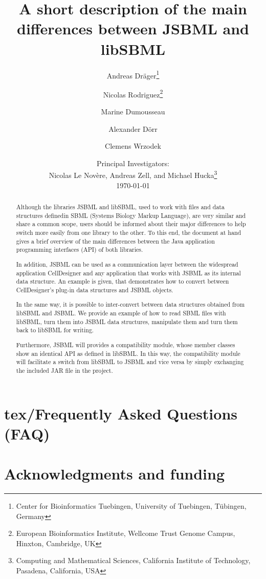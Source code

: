 \documentclass[
  BCOR12mm,
  letterpaper,
  11pt,
  headsepline,
  numbers=noenddot,
  caption=oneline,
  headinclude,
  appendixprefix,
  index=totoc,
  bibliography=totoc,
  twoside,
  titlepage
]{scrartcl}
\title{A short description of the main differences between JSBML and libSBML}
\author{Andreas Dr\"ager\thanks{Center for Bioinformatics Tuebingen, University
of Tuebingen, T\"ubingen, Germany}\and%
Nicolas Rodriguez\thanks{European Bioinformatics Institute, Wellcome Trust
Genome Campus, Hinxton, Cambridge, UK}\and%
Marine Dumousseau\footnotemark[2]\and%
Alexander D\"orr\footnotemark[1]\and%
Clemens Wrzodek\footnotemark[1]}
\date{Principal Investigators:\\
Nicolas Le Nov{\`e}re\footnotemark[2], Andreas Zell\footnotemark[1], and Michael
Hucka\thanks{Computing and Mathematical Sciences, California Institute of
Technology, Pasadena, California, USA}\\[4ex]
\today}
\begin{document}
\maketitle

\begin{abstract}
Although the libraries JSBML and libSBML, used to work with files and data
structures definedin SBML (Systems Biology Markup Language), are
very similar and share a common scope, users should be informed about their
major differences to help switch more easily from one library to the other. To
this end, the document at hand gives a brief overview of the main differences
between the Java\texttrademark{} application programming interfaces (API) of
both libraries.

In addition, JSBML can be used as a communication layer between the widespread
application CellDesigner and any application that works with JSBML as its
internal data structure. An example is given, that demonstrates how to
convert between CellDesigner's plug-in data structures and JSBML objects.

In the same way, it is possible to inter-convert between data structures
obtained from libSBML and JSBML. We provide an example of how to read SBML files
with libSBML, turn them into JSBML data structures, manipulate them and turn
them back to libSBML for writing.

Furthermore, JSBML will provides a compatibility module, whose member classes
show an identical API as defined in libSBML. In this way, the
compatibility module will facilitate a switch from libSBML to JSBML and vice
versa by simply exchanging the included JAR file in the project.


\end{abstract}

\tableofcontents


\appendix

\section{tex/Frequently Asked Questions (FAQ)}


\section{Acknowledgments and funding}






\printindex
\end{document}
